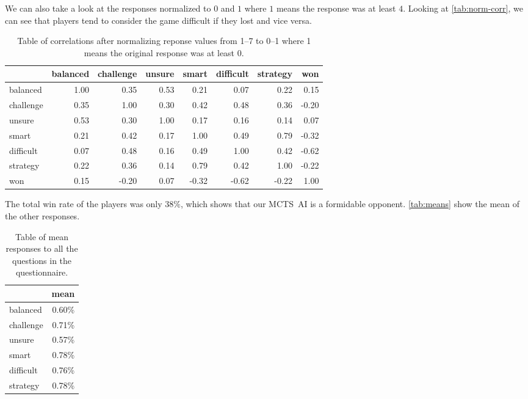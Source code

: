 We can also take a look at the responses normalized to $0$ and $1$ where $1$ means
the response was at least $4$. Looking at \autoref{tab:norm-corr}, we can see that players
tend to consider the game difficult if they lost and vice versa.

\begin{table}[h]
	\centering
	\begin{tabular}{lrrrrrrr}
		\toprule
		{} &  balanced &  challenge &  unsure &  smart &  difficult &  strategy &   won \\
		\midrule
		balanced  &      1.00 &       0.35 &    0.53 &   0.21 &       0.07 &      0.22 &  0.15 \\
		challenge &      0.35 &       1.00 &    0.30 &   0.42 &       0.48 &      0.36 & -0.20 \\
		unsure    &      0.53 &       0.30 &    1.00 &   0.17 &       0.16 &      0.14 &  0.07 \\
		smart     &      0.21 &       0.42 &    0.17 &   1.00 &       0.49 &      0.79 & -0.32 \\
		difficult &      0.07 &       0.48 &    0.16 &   0.49 &       1.00 &      0.42 & \cellcolor{blue!25}-0.62 \\
		strategy  &      0.22 &       0.36 &    0.14 &   0.79 &       0.42 &      1.00 & -0.22 \\
		won       &      0.15 &      -0.20 &    0.07 &  -0.32 &      -0.62 &     -0.22 &  1.00 \\
		\bottomrule
	\end{tabular}
	\caption{Table of correlations after normalizing reponse values from 1--7 to 0--1 where 1 means the original response was at least 0.}
	\label{tab:norm-corr}
\end{table}

The total win rate of the players was only $38\%$, which shows that our MCTS~AI
is a formidable opponent. \autoref{tab:means} show the mean of the other responses.

\begin{table}[h]
	\centering
	\begin{tabular}{lr}
		\toprule
		{} & mean \\ 
		\midrule
		balanced        &       0.60\% \\
		challenge       &       0.71\% \\
		unsure  &       0.57\% \\
		smart   &       0.78\% \\
		difficult       &       0.76\% \\
		strategy        &       0.78\% \\
		\bottomrule
	\end{tabular}
	\caption{Table of mean responses to all the questions in the questionnaire.}
	\label{tab:means}
\end{table}

